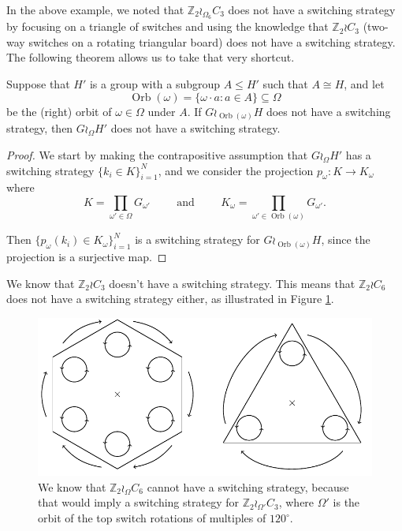 In the above example, we noted that $\mathbb Z_2 \wr_{\Omega_6} C_3$ does
not have a switching strategy by focusing on a triangle of switches and
using the knowledge that $\mathbb Z_2 \wr C_3$
(two-way switches on a rotating triangular board) does not have a switching
strategy. The following theorem allows us to take that very shortcut.
\begin{theorem}
  Suppose that $H'$ is a group with a subgroup $A \leq H'$ such that
  $A \cong H$,
  and let \[
    \operatorname{Orb}(\omega) = \{\omega \cdot a : a \in A \} \subseteq \Omega
  \]
  be the (right) orbit of $\omega \in \Omega$ under $A$.
  If $G \wr_{\operatorname{Orb}(\omega)} H$ does not have a switching strategy,
  then $G \wr_\Omega H'$ does not have a switching strategy.
  \label{thm:SpinReduction2}
\end{theorem}
\begin{proof}
  We start by making the contrapositive assumption that $G \wr_\Omega H'$
  has a switching strategy ${\{k_i \in K\}_{i=1}^N}$,
  and we consider the projection
  $p_\omega \colon K \rightarrow K_\omega$ where
  \[
    K = \prod_{\omega' \in \Omega} G_{\omega'}
    \hspace{1cm}\text{and}\hspace{1cm}
    K_{\omega} = \prod_{\omega' \in \operatorname{Orb}(\omega)} G_{\omega'}.
  \]

  Then $\{p_\omega(k_i) \in K_\omega\}_{i=1}^N$ is a switching strategy for
  $G \wr_{\operatorname{Orb}(\omega)} H$, since the projection is a surjective
  map.
\end{proof}

\begin{example}
  We know that $\mathbb Z_2 \wr C_3$ doesn't have a switching strategy.
  This means that $\mathbb Z_2 \wr C_6$ does not have a switching strategy either,
  as illustrated in Figure \ref{fig:Z2C6_2}.
\end{example}
\begin{figure}
  \center
  \includegraphics{assets/tikz_Z2C6_2.pdf}
  \caption[A reduction from a hexagonal table to a triangular table.]{
    We know that $\mathbb Z_2 \wr_\Omega C_6$ cannot have
    a switching strategy, because that would imply a switching strategy for
    $\mathbb Z_2 \wr_{\Omega'} C_3$, where $\Omega'$
    is the orbit of the top switch rotations of multiples of $120^\circ$.
  }
  \label{fig:Z2C6_2}
\end{figure}

